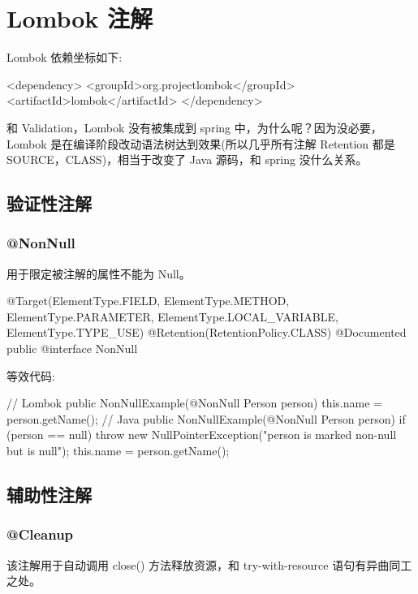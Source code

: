 \section{Lombok 注解}

Lombok 依赖坐标如下:

\begin{xml}
<dependency>
    <groupId>org.projectlombok</groupId>
    <artifactId>lombok</artifactId>
</dependency>
\end{xml}

和 Validation，Lombok 没有被集成到 spring 中，为什么呢？因为没必要，Lombok 是在编译阶段改动语法树达到效果(所以几乎所有注解 Retention 都是 SOURCE，CLASS)，相当于改变了 Java 源码，和 spring 没什么关系。

\subsection{验证性注解}

\subsubsection{@NonNull}

用于限定被注解的属性不能为 Null。

\begin{Java}
@Target({ElementType.FIELD, ElementType.METHOD, ElementType.PARAMETER, ElementType.LOCAL_VARIABLE, ElementType.TYPE_USE})
@Retention(RetentionPolicy.CLASS)
@Documented
public @interface NonNull { }
\end{Java}

等效代码:

\begin{Java}
// Lombok
public NonNullExample(@NonNull Person person) {
    this.name = person.getName();
}
// Java
public NonNullExample(@NonNull Person person) {
    if (person == null) {
      throw new NullPointerException("person is marked non-null but is null");
    }
    this.name = person.getName();
}
\end{Java}

\subsection{辅助性注解}
\subsubsection{@Cleanup}

该注解用于自动调用 close() 方法释放资源，和 try-with-resource 语句有异曲同工之处。

